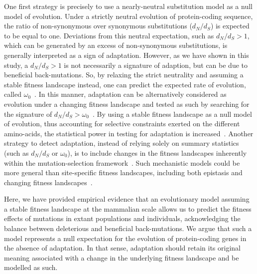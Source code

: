\documentclass{article}
\newcommand{\dn}{d_N}
\newcommand{\ds}{d_S}
\newcommand{\dnds}{\dn / \ds}
\begin{document}
    One first strategy is precisely to use a nearly-neutral substitution model as a null model of evolution.
    Under a strictly neutral evolution of protein-coding sequence, the ratio of non-synonymous over synonymous substitutions ($\dnds$) is expected to be equal to one.
    Deviations from this neutral expectation, such as $\dnds > 1$, which can be generated by an excess of non-synonymous substitutions, is generally interpreted as a sign of adaptation.
    However, as we have shown in this study, a $\dnds > 1$ is not necessarily a signature of adaption, but can be due to beneficial back-mutations.
    So, by relaxing the strict neutrality and assuming a stable fitness landscape instead, one can predict the expected rate of evolution, called $\omega_0$~\cite{spielman_relationship_2015, dosreis_how_2015}.
    In this manner, adaptation can be alternatively considered as evolution under a changing fitness landscape and tested as such by searching for the signature of $\dnds > \omega_0$~\cite{cvijovic_fate_2015, rodrigue_detecting_2017, rodrigue_bayesian_2021}.
    By using a stable fitness landscape as a null model of evolution, thus accounting for selective constraints exerted on the different amino-acids, the statistical power in testing for adaptation is increased~\cite{latrille_genes_2023}.
    Another strategy to detect adaptation, instead of relying solely on summary statistics (such as $\dnds$ or $\omega_0$), is to include changes in the fitness landscapes inherently within the mutation-selection framework~\cite{tamuri_mutationselection_2021}.
    Such mechanistic models could be more general than site-specific fitness landscapes, including both epistasis and changing fitness landscapes~\cite{goldstein_sequence_2017, stolyarova_senescence_2020}.

    Here, we have provided empirical evidence that an evolutionary model assuming a stable fitness landscape at the mammalian scale allows us to predict the fitness effects of mutations in extant populations and individuals, acknowledging the balance between deleterious and beneficial back-mutations.
    We argue that such a model represents a null expectation for the evolution of protein-coding genes in the absence of adaptation.
    In that sense, adaptation should retain its original meaning associated with a change in the underlying fitness landscape and be modelled as such.

\end{document}
